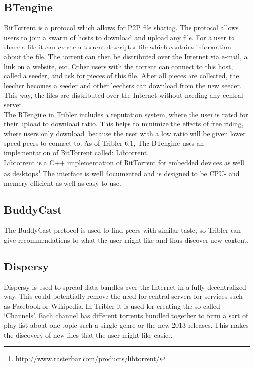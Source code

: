 \subsection{BTengine}
BitTorrent is a protocol which allows for P2P file sharing. The protocol allows users to join a swarm of hosts to download and upload any file. For a user to share a file it can create a torrent descriptor file which contains information about the file. The torrent can then be distributed over the Internet via e-mail, a link on a website, etc. Other users with the torrent can connect to this host, called a seeder, and ask for pieces of this file. After all pieces are collected, the leecher becomes a seeder and other leechers can download from the new seeder. This way, the files are distributed over the Internet without needing any central server.\\ 
The BTengine in Tribler includes a reputation system, where the user is rated for their upload to download ratio. This helps to minimize the effects of free riding, where users only download, because the user with a low ratio will be given lower speed peers to connect to. As of Tribler 6.1, The BTengine uses an implementation of BitTorrent called: Libtorrent.\\
Libtorrent is a C++ implementation of BitTorrent for embedded devices as well as desktops\footnote{http://www.rasterbar.com/products/libtorrent/}.The interface is well documented and is designed to be CPU- and memory-efficient as well as easy to use.

\subsection{BuddyCast}
The BuddyCast protocol is used to find peers with similar taste, so Tribler can give recommendations to what the user might like and thus discover new content. 

\subsection{Dispersy}
Dispersy is used to spread data bundles over the Internet in a fully decentralized way. This could potentially remove the need for central servers for services such as Facebook or Wikipedia. In Tribler it is used for creating the so called `Channels'. Each channel has different torrents bundled together to form a sort of play list about one topic such a single genre or the new 2013 releases. This makes the discovery of new files that the user might like easier.

